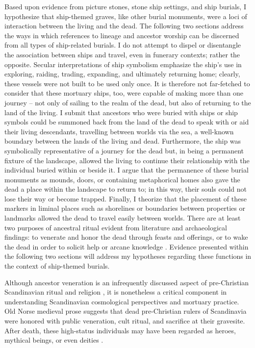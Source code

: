 Based upon evidence from picture stones, stone ship settings, and ship burials, I hypothesize that ship-themed graves, like other burial monuments, were a loci of interaction between the living and the dead. The following two sections address the ways in which references to lineage and ancestor worship can be discerned from all types of ship-related burials. I do not attempt to dispel or disentangle the association between ships and travel, even in funerary contexts; rather the opposite. Secular interpretations of ship symbolism emphasize the ship’s use in exploring, raiding, trading, expanding, and ultimately returning home; clearly, these vessels were not built to be used only once. It is therefore not far-fetched to consider that these mortuary ships, too, were capable of making more than one journey – not only of sailing to the realm of the dead, but also of returning to the land of the living. I submit that ancestors who were buried with ships or ship symbols could be summoned back from the land of the dead to speak with or aid their living descendants, travelling between worlds via the sea, a well-known boundary between the lands of the living and dead. Furthermore, the ship was symbolically representative of a journey for the dead but, in being a permanent fixture of the landscape, allowed the living to continue their relationship with the individual buried within or beside it. I argue that the permanence of these burial monuments as mounds, doors, or containing metaphorical homes also gave the dead a place within the landscape to return to; in this way, their souls could not lose their way or become trapped. Finally, I theorize that the placement of these markers in liminal places such as shorelines or boundaries between properties or landmarks allowed the dead to travel easily between worlds. There are at least two purposes of ancestral ritual evident from literature and archaeological findings: to venerate and honor the dead through feasts and offerings, or to wake the dead in order to solicit help or arcane knowledge \parencite[171]{Sanmark_2010}. Evidence presented within the following two sections will address my hypotheses regarding these functions in the context of ship-themed burials.


Although ancestor veneration is an infrequently discussed aspect of pre-Christian Scandinavian ritual and religion \parencites{Nordberg_2013}[][but see]{Sundqvist_2015}, it is nonetheless a critical component in understanding Scandinavian cosmological perspectives and mortuary practice.
Old Norse medieval prose suggests that dead pre-Christian rulers of Scandinavia were honored with public veneration, cult ritual, and sacrifice at their gravesite. After death, these high-status individuals may have been regarded as heroes, mythical beings, or even deities \parencite[177]{Sundqvist_2015}.

